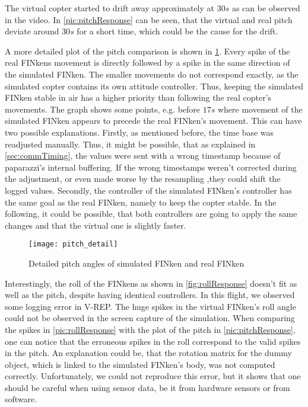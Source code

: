 The virtual copter started to drift away approximately at $30s$ as can be observed in the video.
In \ref{pic:pitchResponse} can be seen, that the virtual and real pitch deviate around $30s$ for a short time, which could be the cause for the drift.

A more detailed plot of the pitch comparison is shown in \ref{pic:pitchDetail}.
Every spike of the real FINkens movement is directly followed by a spike in the same direction of the simulated FINken.
The smaller movements do not correspond exactly, as the simulated copter contains its own attitude controller.
Thus, keeping the simulated FINken stable in air has a higher priority than following the real copter's movements.
The graph shows some points, e.g. before $17s$ where movement of the simulated FINken appears to precede the real FINken's movement.
This can have two possible explanations.
Firstly, as mentioned before, the time base was readjusted manually.
Thus, it might be possible, that as explained in \ref{sec:commTiming}, the values were sent with a wrong timestamp because of paparazzi's internal buffering.
If the wrong timestamps weren't corrected during the adjustment, or even made worse by the resampling ,they could shift the logged values.
Secondly,  the controller of the simulated FINken's controller has the same goal as the real FINken, namely to keep the copter stable. 
In the following, it could be possible, that both controllers are going to apply the same changes and that the virtual one is slightly faster.
 

\begin{figure}
	\begin{center}
	\texttt{[image: pitch\_detail]}
	\caption{Detailed pitch angles of simulated FINken and real FINken}
	\label{pic:pitchDetail}
	\end{center}
\end{figure}

Interestingly, the roll of the FINkens as shown in \ref{fig:rollResponse} doesn't fit as well as the pitch, despite having identical controllers.
In this flight, we observed some logging error in V-REP. 
The huge spikes in the virtual FINken's roll angle could not be observed in the screen capture of the simulation.
When comparing the spikes in \ref{pic:rollResponse} with the plot of the pitch in \ref{pic:pitchResponse}, one can notice that the erroneous spikes in the roll correspond to the valid spikes in the pitch.
An explanation could be, that the rotation matrix for the dummy object, which is linked to the simulated FINken's body, was not computed correctly.
Unfortunately, we could not reproduce this error, but it shows that one should be careful when using sensor data, be it from hardware sensors or from software.

